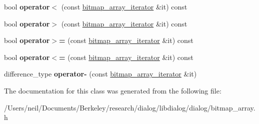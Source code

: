 \begin{DoxyCompactItemize}
bool {\bfseries operator$<$} (const \hyperlink{classdialog_1_1bitmap__array__iterator}{bitmap\+\_\+array\+\_\+iterator} \&it) const
\item 
\mbox{\label{classdialog_1_1bitmap__array__iterator_a15d7dcead69e0224cfd9a44c8a616118}} 
bool {\bfseries operator$>$} (const \hyperlink{classdialog_1_1bitmap__array__iterator}{bitmap\+\_\+array\+\_\+iterator} \&it) const
\item 
\mbox{\label{classdialog_1_1bitmap__array__iterator_a7bbfdf826b8a0b6f1877f8170713b23c}} 
bool {\bfseries operator$>$=} (const \hyperlink{classdialog_1_1bitmap__array__iterator}{bitmap\+\_\+array\+\_\+iterator} \&it) const
\item 
\mbox{\label{classdialog_1_1bitmap__array__iterator_a5ca6b5fdd801f6b29398bcd6989f4d27}} 
bool {\bfseries operator$<$=} (const \hyperlink{classdialog_1_1bitmap__array__iterator}{bitmap\+\_\+array\+\_\+iterator} \&it) const
\item 
\mbox{\label{classdialog_1_1bitmap__array__iterator_a90b4535f4d21f04d198fb7b01f7a077c}} 
difference\+\_\+type {\bfseries operator-\/} (const \hyperlink{classdialog_1_1bitmap__array__iterator}{bitmap\+\_\+array\+\_\+iterator} \&it)
\end{DoxyCompactItemize}


The documentation for this class was generated from the following file\+:\begin{DoxyCompactItemize}
\item 
/\+Users/neil/\+Documents/\+Berkeley/research/dialog/libdialog/dialog/bitmap\+\_\+array.\+h\end{DoxyCompactItemize}

